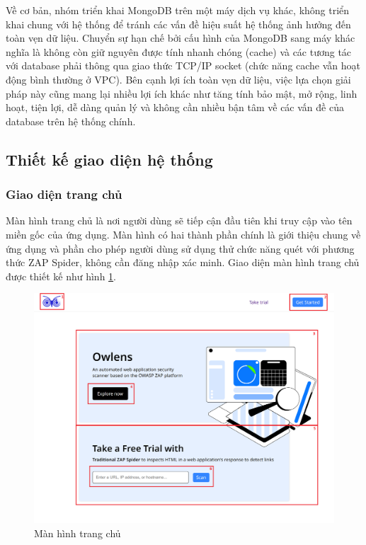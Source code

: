Về cơ bản, nhóm triển khai MongoDB trên một máy dịch vụ khác, không triển khai chung với hệ thống để tránh các vấn đề hiệu suất hệ thống ảnh hưởng đến toàn vẹn dữ liệu.
Chuyển sự hạn chế bởi cấu hình của MongoDB sang máy khác nghĩa là không còn giữ nguyên được tính nhanh chóng (cache) và các tương tác với database phải thông qua giao thức TCP/IP socket (chức năng cache vẫn hoạt động bình thường ở VPC).
Bên cạnh lợi ích toàn vẹn dữ liệu, việc lựa chọn giải pháp này cũng mang lại nhiều lợi ích khác như tăng tính bảo mật, mở rộng, linh hoạt, tiện lợi, dễ dàng quản lý và không cần nhiều bận tâm về các vấn đề của database trên hệ thống chính.

\subsection{Thiết kế giao diện hệ thống}

\subsubsection{Giao diện trang chủ}

\tab Màn hình trang chủ là nơi người dùng sẽ tiếp cận đầu tiên khi truy cập vào tên miền gốc của ứng dụng.
Màn hình có hai thành phần chính là giới thiệu chung về ứng dụng và phần cho phép người dùng sử dụng thử chức năng quét với phương thức ZAP Spider, không cần đăng nhập xác minh.
Giao diện màn hình trang chủ được thiết kế như hình \ref{fig:MHTrangChu}.

\begin{figure}[H]
      \centering
      \includegraphics[width=\textwidth]{applied-thesis-chapters/chapter-3/Màn hình trang chủ.png}
      \caption{Màn hình trang chủ}
      \label{fig:MHTrangChu}
\end{figure}

